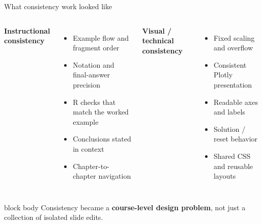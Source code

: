 \documentclass[aspectratio=169,10pt]{beamer}
\begin{document}
\begin{frame}{What consistency work looked like}
\vspace{0.55em}
\begin{columns}[T,onlytextwidth]
\textbf{Instructional consistency}
\begin{itemize}
  \item Example flow and fragment order
  \item Notation and final-answer precision
  \item R checks that match the worked example
  \item Conclusions stated in context
  \item Chapter-to-chapter navigation
\end{itemize}

\textbf{Visual / technical consistency}
\begin{itemize}
  \item Fixed scaling and overflow
  \item Consistent Plotly presentation
  \item Readable axes and labels
  \item Solution / reset behavior
  \item Shared CSS and reusable layouts
\end{itemize}
\end{columns}

\vspace{0.75em}
\begin{beamercolorbox}[rounded=true,sep=0.85em,wd=\textwidth]{block body}
\centering
Consistency became a \textbf{course-level design problem}, not just a collection of isolated slide edits.
\end{beamercolorbox}
\end{frame}
\end{document}
